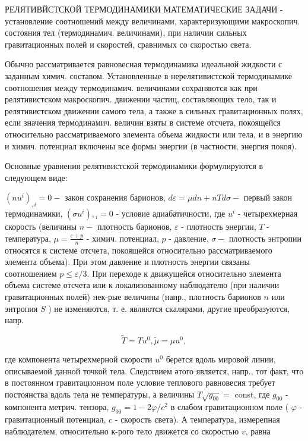 \documentclass[10pt]{article}
\begin{document}
РЕЛЯТИВЙСТСКОЙ ТЕРМОДИНАМИКИ МАТЕМАТИЧЕСКИЕ ЗАДАЧИ - установление соотношений между величинами, характеризующими макроскопич. состояния тел (термодинамич. величинами), при наличии сильных гравитационных полей и скоростей, сравнимых со скоростью света.



Обычно рассматривается равновесная термодинамика идеальной жидкости с заданным химич. составом. Установленные в нерелятивистской термодинамике соотношения между термодинамич. величинами сохраняются как при релятивистском макроскопич. движении частиц, составляющих тело, так и релятивистском движении самого тела, а также в сильных гравитационных полях, если значения термодинамич. величин взяты в системе отсчета, покоящейся относительно рассматриваемого элемента объема жидкости или тела, и в энергию и химич. потенциал включены все формы энергии (в частности, энергия покоя).



Основные уравнения релятивистской термодинамики формулируются в следующем виде:



$\left(n u^{i}\right)_{, i}=0-$ закон сохранения барионов, $d \varepsilon=\mu d n+n T d \sigma-$ первый закон термодинамики, $\left(\sigma u^{i}\right),{ }_{i}=0$ - условие адиабатичности, где $u^{i}$ - четырехмерная скорость (величины $n-$ плотность барионов, $\varepsilon$ - плотность энергии, $T$ - температура, $\mu=\frac{\varepsilon+p}{n}$ - химич. потенциал, $p$ - давление, $\sigma-$ плотность энтропии относятся к системе отсчета, покоящейся относительно рассматриваемого элемента объема). При этом давление и плотность энергии связаны соотношением $p \leqslant \varepsilon / 3$. При переходе к движущейся относительно элемента объема системе отсчета или к локализованному наблюдателю (при наличии гравитационных полей) нек-рые величины (напр., плотность барионов $n$ или энтропия $S$ ) не изменяются, т. е. являются скалярами, другие преобразуются, напр.



\[

\tilde{T}=T u^{0}, \tilde{\mu}=\mu u^{0},

\]



где компонента четырехмерной скорости $u^{0}$ берется вдоль мировой линии, описываемой данной точкой тела. Следствием әтого является, напр., тот факт, что в постоянном гравитационном поле условие теплового равновесия требует постоянства вдоль тела не температуры, а величины $T \sqrt{g_{00}}=$ const, где $g_{00}$ - компонента метрич. тензора, $g_{00}=1-2 \varphi / c^{2}$ в слабом гравитационном поле ( $\varphi$ - гравитационный потенциал, $c$ - скорость света). А температура, измерепная наблюдателем, относительно к-рого тело движется со скоростью $v$, равна
\end{document}
